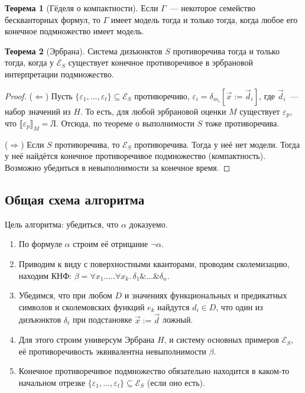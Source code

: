 \documentclass[a4paper,11pt]{article}
\theoremstyle{definition}
\newtheorem*{thm}{Теорема}
\newcommand{\False}{\text{Л}}
\newcommand{\amp}{\mathbin{\&}}
\begin{document}
\begin{thm}[Гёделя о компактности]
Если $\Gamma$~--- некоторое семейство бескванторных формул, то $\Gamma$ имеет
модель тогда и только тогда, когда любое его конечное подмножество имеет модель.
\end{thm}
\begin{thm}[Эрбрана]
Система дизъюнктов $S$ противоречива тогда и только тогда, когда у
$\mathcal{E}_S$ существует конечное противоречивое в эрбрановой интерпретации
подмножество.
\end{thm}
\begin{proof}
($\Leftarrow$) Пусть $\{\varepsilon_1, \dots, \varepsilon_t\} \subseteq
\mathcal{E}_S$ противоречиво, $\varepsilon_i = \delta_{m_i}[\vec x := \vec
d_i]$, где $\vec d_i$~--- набор значений из $H$. То есть, для любой эрбрановой
оценки $M$ существует $\varepsilon_p$, что $\llbracket\varepsilon_p\rrbracket_M =
\False$. Отсюда, по теореме о выполнимости $S$ тоже противоречива.

($\Rightarrow$) Если $S$ противоречива, то $\mathcal{E}_S$ противоречива. Тогда у
неё нет модели. Тогда у неё найдётся конечное противоречивое подмножество
(компактность). Возможно убедиться в невыполнимости за конечное время.
\end{proof}

\subsection*{Общая схема алгоритма}
Цель алгоритма: убедиться, что $\alpha$ доказуемо.
\begin{enumerate}
\item По формуле $\alpha$ строим её отрицание $\neg\alpha$.
\item Приводим к виду с поверхностными кванторами, проводим сколемизацию,
  находим КНФ: $\beta = \forall x_1.\dots.\forall x_k.\,\delta_1 \amp \dots \amp
  \delta_n$.
\item Убедимся, что при любом $D$ и значениях функциональных и предикатных
  символов и сколемовских функций $e_k$ найдутся $d_i \in D$, что один из
  дизъюнктов $\delta_t$ при подстановке $\vec x := \vec d$ ложный.
\item Для этого строим универсум Эрбрана $H$, и систему основных примеров
  $\mathcal{E}_S$, её противоречивость эквивалентна невыполнимости $\beta$.
\item Конечное противоречивое подмножество обязательно находится в каком-то
  начальном отрезке $\{\varepsilon_1, \dots, \varepsilon_t\} \subseteq
  \mathcal{E}_S$ (если оно есть).
\end{enumerate}
\end{document}
